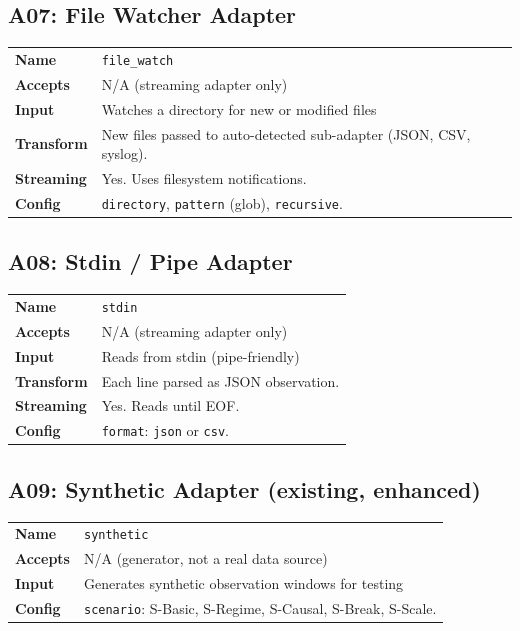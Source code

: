\documentclass[11pt,a4paper,twoside]{article}
\theoremstyle{definition}
\theoremstyle{plain}
\theoremstyle{remark}
\begin{document}
\subsection{A07: File Watcher Adapter}

\begin{tabularx}{\textwidth}{l X}
\toprule
\textbf{Name} & \texttt{file\_watch} \\
\textbf{Accepts} & N/A (streaming adapter only) \\
\textbf{Input} & Watches a directory for new or modified files \\
\textbf{Transform} & New files passed to auto-detected sub-adapter
  (JSON, CSV, syslog). \\
\textbf{Streaming} & Yes. Uses filesystem notifications. \\
\textbf{Config} & \texttt{directory}, \texttt{pattern} (glob),
  \texttt{recursive}. \\
\bottomrule
\end{tabularx}

\subsection{A08: Stdin / Pipe Adapter}

\begin{tabularx}{\textwidth}{l X}
\toprule
\textbf{Name} & \texttt{stdin} \\
\textbf{Accepts} & N/A (streaming adapter only) \\
\textbf{Input} & Reads from stdin (pipe-friendly) \\
\textbf{Transform} & Each line parsed as JSON observation. \\
\textbf{Streaming} & Yes. Reads until EOF. \\
\textbf{Config} & \texttt{format}: \texttt{json} or \texttt{csv}. \\
\bottomrule
\end{tabularx}

\subsection{A09: Synthetic Adapter (existing, enhanced)}

\begin{tabularx}{\textwidth}{l X}
\toprule
\textbf{Name} & \texttt{synthetic} \\
\textbf{Accepts} & N/A (generator, not a real data source) \\
\textbf{Input} & Generates synthetic observation windows for testing \\
\textbf{Config} & \texttt{scenario}: S-Basic, S-Regime, S-Causal,
  S-Break, S-Scale. \\
\bottomrule
\end{tabularx}
\end{document}
